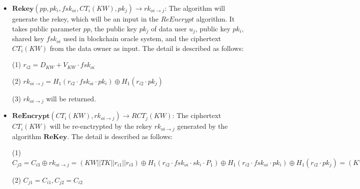 \documentclass[journal,10pt]{IEEEtran}
\begin{document}
\begin{itemize}
    \item $ \boldsymbol{Rekey}(pp, pk_i, fsk_{oi}, CT_i(KW), pk_j) \to rk_{oi \to j}$: The algorithm will generate the rekey, which will be an input in the $ReEncrypt$ algorithm. It takes public parameter $pp$, the public key $pk_j$ of data user $u_j$, public key $pk_i$, shared key $fsk_{oi}$ used in blockchain oracle system, and the ciphertext $CT_i(KW)$ from the data owner as input.
    The detail is described as follows:
    
    (1) $r_{i2} = D_{KW} + V_{KW} \cdot fsk_{oi}$
    
    (2) $rk_{oi \to j} = H_1(r_{i2} \cdot fsk_{oi} \cdot pk_i) \oplus H_1(r_{i2} \cdot pk_j)$
    
    (3) $rk_{oi \to j}$ will be returned.
    
    \item $ \boldsymbol{ReEncrypt}(CT_i(KW), rk_{oi \to j}) \to RCT_j(KW)$:
    The ciphertext $CT_i(KW)$ will be re-enctrypted by the rekey $rk_{oi \to j}$ generated by the algorithm $\boldsymbol{ReKey}$.
    The detail is described as follows:
    
    (1) $C_{j3} = C_{i3} \oplus rk_{oi \to j} = (KW||TK||r_{i1}||r_{i3}) \oplus  H_1(r_{i2} \cdot fsk_{oi} \cdot sk_i \cdot P_1) \oplus H_1(r_{i2} \cdot fsk_{oi} \cdot pk_i) \oplus H_1(r_{i2} \cdot pk_j)  = (KW||TK||r_{i1}||r_{i3}) \oplus H_1(r_{i2} \cdot pk_j)$
    
    (2) $C_{j1} = C_{i1}, C_{j2} = C_{i2}$
    
\end{itemize}
\end{document}
